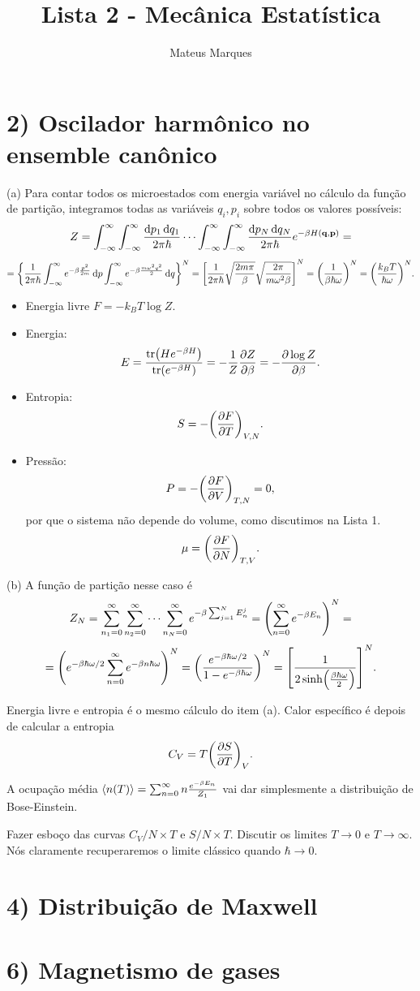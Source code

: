 \documentclass[a4paper,10pt]{article}
\title{\Huge{\textbf{Lista 2 - Mecânica Estatística}}}
\author{Mateus Marques}
\begin{document}
\maketitle

\section*{2) Oscilador harmônico no ensemble canônico}

(a) Para contar todos os microestados com energia variável no cálculo da função de partição, integramos todas as variáveis $q_i, p_i$ sobre todos os valores possíveis:
$$
Z = \int_{-\infty}^{\infty}\int_{-\infty}^{\infty} \frac{\dd{p_1} \dd{q_1}}{2\pi\hbar} \cdots \int_{-\infty}^{\infty}\int_{-\infty}^{\infty} \frac{\dd{p_N} \dd{q_N}}{2\pi\hbar} e^{-\beta H(\vb{q}, \vb{p})} =
$$
$$
= \qty{\frac{1}{2\pi\hbar} \int_{-\infty}^{\infty} e^{-\beta \frac{p^2}{2m}} \dd{p} \int_{-\infty}^{\infty} e^{-\beta \frac{m\omega^2q^2}{2} }\dd{q}}^N =
\qty[ \frac{1}{2\pi\hbar} \sqrt{\frac{2m\pi}{\beta}} \sqrt{\frac{2\pi}{m\omega^2\beta}} ]^N =
\qty(\frac{1}{\beta \hbar \omega})^N = \qty(\frac{k_B T}{\hbar \omega})^N.
$$

\begin{itemize}
\item Energia livre $F = - k_B T \log Z$.
\item Energia:
$$
E = \frac{\tr(H e^{-\beta H})}{\tr(e^{-\beta H})} = - \frac{1}{Z} \pdv{Z}{\beta} = - \pdv{\log Z}{\beta}.
$$
\item Entropia:
$$
S = -\qty(\pdv{F}{T})_{V,N}.
$$
\item Pressão:
$$
P = -\qty(\pdv{F}{V})_{T,N} = 0,
$$
por que o sistema não depende do volume, como discutimos na Lista 1.
$$
\mu = \qty(\pdv{F}{N})_{T,V}.
$$
\end{itemize}

(b) A função de partição nesse caso é
$$
Z_N = \sum_{n_1 = 0}^{\infty} \sum_{n_2 = 0}^{\infty} \cdots \sum_{n_N = 0}^{\infty} e^{-\beta \sum_{j=1}^{N} E_n^j} =
\qty(\sum_{n=0}^{\infty} e^{-\beta E_n})^N =
$$
$$
= \qty(e^{-\beta \hbar \omega / 2} \sum_{n=0}^{\infty} e^{-\beta n \hbar\omega})^N =
\qty(\frac{e^{-\beta \hbar \omega / 2}}{1 - e^{-\beta\hbar\omega}})^N =
\qty[\frac{1}{2\sinh(\frac{\beta\hbar\omega}{2})}]^N.
$$

Energia livre e entropia é o mesmo cálculo do item (a). Calor específico é depois de calcular a entropia
$$
C_V = T \qty(\pdv{S}{T})_{V}.
$$

A ocupação média $\ev{n(T)} = \sum_{n=0}^{\infty} n \frac{e^{-\beta E_n}}{Z_1}$ vai dar simplesmente a distribuição de Bose-Einstein.

\n

Fazer esboço das curvas $C_V/N \times T$ e $S/N \times T$. Discutir os limites $T \to 0$ e $T \to \infty$. Nós claramente recuperaremos o limite clássico quando $\hbar \to 0$.

\pagebreak

\section*{4) Distribuição de Maxwell}

\pagebreak

\section*{6) Magnetismo de gases}
\end{document}
